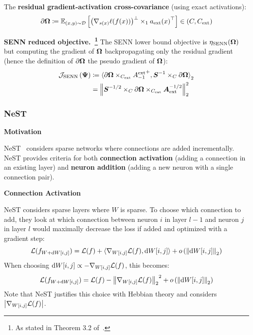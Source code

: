 \begin{definition}
The \textbf{residual gradient-activation cross-covariance} (using exact
activations):
\[\partial\boldsymbol{\Omega}{} \coloneqq \mathbb{E}_{(x,y) \sim \mathcal{D}}\left\lbrack \left( \nabla_{s(x)}\ell(f(x)) \right)^{\bot} \times_{1}{a_{\text{ext}}(x)}^{\top} \right\rbrack \in \left( C,C_{\text{ext}} \right)\]
\end{definition}

\begin{proposition}\label{prop:senn_reduced}
\textbf{SENN reduced objective.~\footnote{As stated in Theorem 3.2 of~\citep{mitchell_self-expanding_2024}.}} The SENN lower bound objective is
\(\eta_{\text{SENN}}(\boldsymbol{\Omega}{})\) but computing the gradient of
\(\boldsymbol{\Omega}{}\) backpropagating only the residual gradient (hence the
definition of \(\partial\boldsymbol{\Omega}{}\) the pseudo gradient of
\(\boldsymbol{\Omega}{}\)):
\begin{equation}\label{eq:senn_reduced}
\begin{aligned}
\mathcal{J}_{\text{SENN}}\left( \boldsymbol{\Psi}{} \right) & \coloneqq {\langle\partial\boldsymbol{\Omega}{} \times_{C_{\text{ext}}}{A_{- 1}^{\text{ext}}}^{+},\boldsymbol{S}^{- 1} \times_{C}\partial\boldsymbol{\Omega}{}\rangle}_{2} \\
 & = \left\| {\boldsymbol{S}^{-1/2} \times_{C}\partial\boldsymbol{\Omega}{} \times_{C_{\text{ext}}}\boldsymbol{A}_{\text{ext}}^{-1/2}} \right\|_{2}^{2}
\end{aligned}
\end{equation}
\end{proposition}

\subsubsection{NeST}

\noindent\textbf{Motivation}

NeST~\citep{daiNeSTNeuralNetwork2019} considers sparse networks where
connections are added incrementally. NeST provides criteria for both
\textbf{connection activation} (adding a connection in an existing
layer) and \textbf{neuron addition} (adding a new neuron with a single
connection pair).

\textbf{Connection Activation}

NeST considers sparse layers where \(W\) is sparse. To choose which
connection to add, they look at which connection between neuron \(i\) in
layer \(l - 1\) and neuron \(j\) in layer \(l\) would maximally decrease
the loss if added and optimized with a gradient step:
\[\mathcal{L}(f_{W + {\mathrm{d}W}\lbrack i,j\rbrack}) = \mathcal{L}(f) + {\langle\nabla_{W\lbrack i,j\rbrack}\mathcal{L}(f),{\mathrm{d}W}\lbrack i,j\rbrack\rangle} + o\left( \left\| {{\mathrm{d}W}\lbrack i,j\rbrack} \right\|_{2} \right)\]
When choosing
\({\mathrm{d}W}\lbrack i,j\rbrack \propto - \nabla_{W\lbrack i,j\rbrack}\mathcal{L}(f)\),
this becomes:
\[\mathcal{L}(f_{W + {\mathrm{d}W}\lbrack i,j\rbrack}) = \mathcal{L}(f) - {\left\| {\nabla_{W\lbrack i,j\rbrack}\mathcal{L}(f)} \right\|_{2}}^{2} + o\left( \left\| {{\mathrm{d}W}\lbrack i,j\rbrack} \right\|_{2} \right)\]
Note that NeST justifies this choice with Hebbian theory and considers
\(\left| {\nabla_{W\lbrack i,j\rbrack}\mathcal{L}(f)} \right|\).

